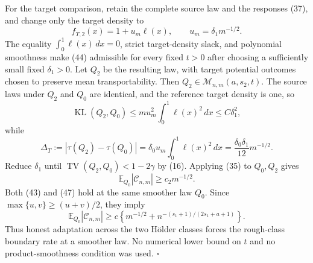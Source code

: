 For the target comparison, retain the complete source law and the responses (37), and change only the target density to
\[
f_{T,2}(x)=1+u_m\ell(x),
\qquad
u_m=\delta_1m^{-1/2}.
\tag{44}
\]
The equality \(\int_0^1\ell(x)\,dx=0\), strict target-density slack, and polynomial smoothness make (44) admissible for every fixed \(t>0\) after choosing a sufficiently small fixed \(\delta_1>0\).  Let \(Q_2\) be the resulting law, with target potential outcomes chosen to preserve mean transportability.  Then \(Q_2\in\mathcal M_{n,m}(a,s_2,t)\).  The source laws under \(Q_2\) and \(Q_0\) are identical, and the reference target density is one, so
\[
\operatorname{KL}(Q_2,Q_0)
\le mu_m^2\int_0^1\ell(x)^2\,dx
\le C\delta_1^2,
\tag{45}
\]
while
\[
\Delta_T:=|\tau(Q_2)-\tau(Q_0)|
=\delta_0u_m\int_0^1\ell(x)^2\,dx
=\frac{\delta_0\delta_1}{12}m^{-1/2}.
\tag{46}
\]
Reduce \(\delta_1\) until \(\operatorname{TV}(Q_2,Q_0)<1-2\gamma\) by (16).  Applying (35) to \(Q_0,Q_2\) gives
\[
\mathbb E_{Q_0}|\mathcal C_{n,m}|
\ge c_2m^{-1/2}.
\tag{47}
\]
Both (43) and (47) hold at the same smoother law \(Q_0\).  Since \(\max\{u,v\}\ge(u+v)/2\), they imply
\[
\mathbb E_{Q_0}|\mathcal C_{n,m}|
\ge c\left\{m^{-1/2}+n^{-(s_1+1)/(2s_1+a+1)}\right\}.
\]
Thus honest adaptation across the two H\"older classes forces the rough-class boundary rate at a smoother law.  No numerical lower bound on \(t\) and no product-smoothness condition was used. \(\square\)